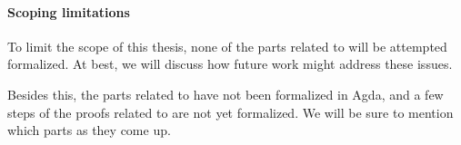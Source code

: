 \paragraph{Scoping limitations} To limit the scope of this thesis, none of the
parts related to \nativelang will be attempted formalized. At best, we will
discuss how future work might address these issues.

Besides this, the parts related to \simplelang have not been formalized in Agda,
and a few steps of the proofs related to \highlang are not yet formalized. We
will be sure to mention which parts as they come up.
